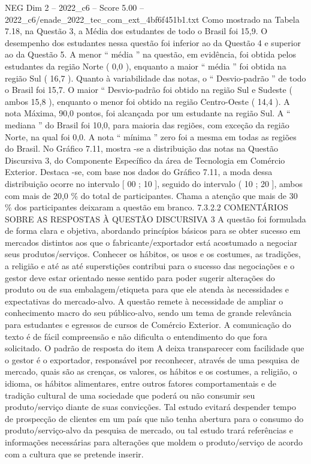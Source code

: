\begin{textsample}{NEG Dim 2 – 2022\_c6 – Score 5.00 – 2022\_c6/enade\_2022\_tec\_com\_ext\_4bf6f451b1.txt}
Como mostrado na Tabela 7.18, na Questão 3, a Média dos estudantes de todo o Brasil foi 15,9.
O desempenho dos estudantes nessa questão foi inferior ao da Questão 4 e superior ao da Questão 5.
A menor “ média ” na questão, em evidência, foi obtida pelos estudantes da região Norte ( 0,0 ), enquanto a maior “ média ” foi obtida na região Sul ( 16,7 ).
Quanto à variabilidade das notas, o “ Desvio-padrão ” de todo o Brasil foi 15,7.
O maior “ Desvio-padrão foi obtido na região Sul e Sudeste ( ambos 15,8 ), enquanto o menor foi obtido na região Centro-Oeste ( 14,4 ).
A nota Máxima, 90,0 pontos, foi alcançada por um estudante na região Sul.
A “ mediana ” do Brasil foi 10,0, para maioria das regiões, com exceção da região Norte, na qual foi 0,0.
A nota “ mínima ” zero foi a mesma em todas as regiões do Brasil.
No Gráfico 7.11, mostra -se a distribuição das notas na Questão Discursiva 3, do Componente Específico da área de Tecnologia em Comércio Exterior.
Destaca -se, com base nos dados do Gráfico 7.11, a moda dessa distribuição ocorre no intervalo [ 00 ; 10 ], seguido do intervalo ( 10 ; 20 ], ambos com mais de 20,0 \% do total de participantes.
Chama a atenção que mais de 30 \% dos participantes deixaram a questão em branco. 7.3.2.2 COMENTÁRIOS SOBRE AS RESPOSTAS À QUESTÃO DISCURSIVA 3 A questão foi formulada de forma clara e objetiva, abordando princípios básicos para se obter sucesso em mercados distintos aos que o fabricante/exportador está acostumado a negociar seus produtos/serviços.
Conhecer os hábitos, os usos e os costumes, as tradições, a religião e até as até superstições contribui para o sucesso das negociações e o gestor deve estar orientado nesse sentido para poder sugerir alterações do produto ou de sua embalagem/etiqueta para que ele atenda às necessidades e expectativas do mercado-alvo.
A questão remete à necessidade de ampliar o conhecimento macro do seu público-alvo, sendo um tema de grande relevância para estudantes e egressos de cursos de Comércio Exterior.
A comunicação do texto é de fácil compreensão e não dificulta o entendimento do que fora solicitado.
O padrão de resposta do item A deixa transparecer com facilidade que o gestor é o exportador, responsável por reconhecer, através de uma pesquisa de mercado, quais são as crenças, os valores, os hábitos e os costumes, a religião, o idioma, os hábitos alimentares, entre outros fatores comportamentais e de tradição cultural de uma sociedade que poderá ou não consumir seu produto/serviço diante de suas convicções.
Tal estudo evitará despender tempo de prospecção de clientes em um país que não tenha abertura para o consumo do produto/serviço-alvo da pesquisa de mercado, ou tal estudo trará referências e informações necessárias para alterações que moldem o produto/serviço de acordo com a cultura que se pretende inserir.

\end{textsample}
